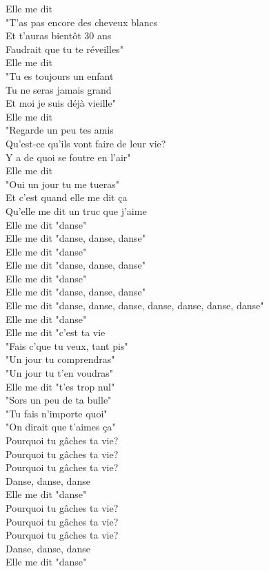 \documentclass{novel}
\begin{document}
\begin{multicols}{2}
Elle me dit \\
"T'as pas encore des cheveux blancs \\
Et t'auras bientôt 30 ans \\
Faudrait que tu te réveilles" \\

Elle me dit \\
"Tu es toujours un enfant \\
Tu ne seras jamais grand \\
Et moi je suis déjà vieille" \\

Elle me dit \\
"Regarde un peu tes amis \\
Qu'est-ce qu'ils vont faire de leur vie? \\
Y a de quoi se foutre en l'air" \\

Elle me dit \\
"Oui un jour tu me tueras" \\
Et c'est quand elle me dit ça \\
Qu'elle me dit un truc que j'aime \\

Elle me dit "danse" \\
Elle me dit "danse, danse, danse" \\
Elle me dit "danse" \\
Elle me dit "danse, danse, danse" \\
Elle me dit "danse" \\
Elle me dit "danse, danse, danse" \\
Elle me dit "danse, danse, danse, danse, danse, danse, danse" \\
Elle me dit "danse" \\

Elle me dit "c'est ta vie \\
"Fais c'que tu veux, tant pis" \\
"Un jour tu comprendras" \\
"Un jour tu t'en voudras" \\

Elle me dit "t'es trop nul" \\
"Sors un peu de ta bulle" \\
"Tu fais n'importe quoi" \\
"On dirait que t'aimes ça" \\

Pourquoi tu gâches ta vie? \\
Pourquoi tu gâches ta vie? \\
Pourquoi tu gâches ta vie? \\
Danse, danse, danse \\
Elle me dit "danse" \\

Pourquoi tu gâches ta vie? \\
Pourquoi tu gâches ta vie? \\
Pourquoi tu gâches ta vie? \\
Danse, danse, danse \\
Elle me dit "danse"
\end{multicols}
\end{document}

